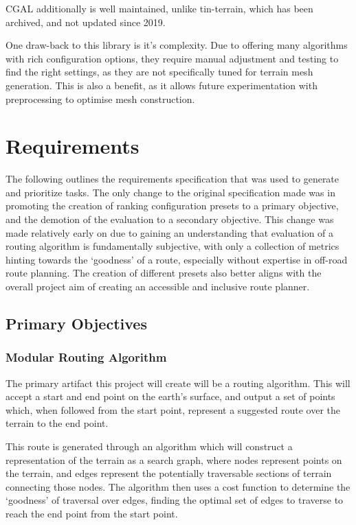 \documentclass[12pt]{article}
\begin{document}
CGAL additionally is well maintained, unlike tin-terrain, which has been archived, and not updated since 2019.

One draw-back to this library is it's complexity. Due to offering many algorithms with rich configuration options, they require manual adjustment and testing to find the right settings, as they are not specifically tuned for terrain mesh generation. This is also a benefit, as it allows future experimentation with preprocessing to optimise mesh construction.

\section{Requirements}

The following outlines the requirements specification that was used to generate and prioritize tasks. The only change to the original specification made was in promoting the creation of ranking configuration presets to a primary objective, and the demotion of the evaluation to a secondary objective. This change was made relatively early on due to gaining an understanding that evaluation of a routing algorithm is fundamentally subjective, with only a collection of metrics hinting towards the `goodness' of a route, especially without expertise in off-road route planning. The creation of different presets also better aligns with the overall project aim of creating an accessible and inclusive route planner.

\subsection{Primary Objectives}

\subsubsection{Modular Routing Algorithm}

The primary artifact this project will create will be a routing algorithm. This will accept a start and end point on the earth's surface, and output a set of points which, when followed from the start point, represent a suggested route over the terrain to the end point.

This route is generated through an algorithm which will construct a representation of the terrain as a search graph, where nodes represent points on the terrain, and edges represent the potentially traversable sections of terrain connecting those nodes. The algorithm then uses a cost function to determine the `goodness' of traversal over edges, finding the optimal set of edges to traverse to reach the end point from the start point.
\end{document}
